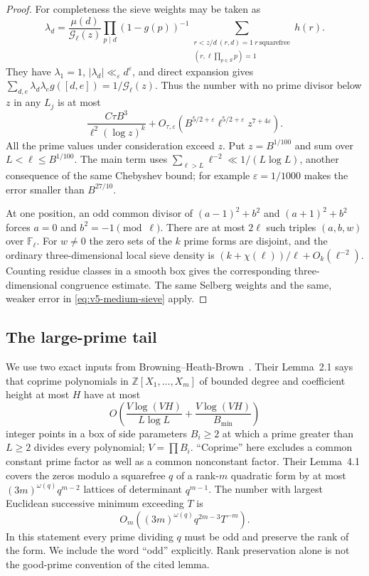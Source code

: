 \begin{proof}
For completeness the sieve weights may be taken as
\[
 \lambda_d=\frac{\mu(d)}{\mathcal G_\ell(z)}
 \prod_{p\mid d}(1-g(p))^{-1}
 \sum_{\substack{r<z/d\ (r,d)=1\ r\ \text{squarefree}\\
                      (r,\ell\prod_{p\in S}p)=1}}h(r).
\]
They have $\lambda_1=1$, $|\lambda_d|\ll_\varepsilon d^\varepsilon$,
and direct expansion gives
$\sum_{d,e}\lambda_d\lambda_e g([d,e])=1/\mathcal G_\ell(z)$.
Thus the number with no prime divisor below $z$ in any $L_j$ is at most
\[
 \frac{C\tau B^3}{\ell^2(\log z)^k}
 +O_{\tau,\varepsilon}
  (B^{5/2+\varepsilon}\ell^{5/2+\varepsilon}z^{7+4\varepsilon}).
\]
All the prime values under consideration exceed $z$. Put $z=B^{1/100}$
and sum over $L<\ell\leq B^{1/100}$. The main term uses
$\sum_{\ell>L}\ell^{-2}\ll1/(L\log L)$, another consequence of the
same Chebyshev bound; for example
$\varepsilon=1/1000$ makes the error smaller than $B^{27/10}$.

At one position, an odd common divisor of $(a-1)^2+b^2$ and
$(a+1)^2+b^2$ forces $a=0$ and $b^2=-1\pmod\ell$.
There are at most $2\ell$ such triples $(a,b,w)$ over $\mathbb F_\ell$.
For $w\ne0$ the zero sets of the $k$ prime forms are disjoint, and the
ordinary three-dimensional local sieve density is
$(k+\chi(\ell))/\ell+O_k(\ell^{-2})$.
Counting residue classes in a smooth box gives the corresponding
three-dimensional congruence estimate. The same Selberg weights and the
same, weaker error in \eqref{eq:v5-medium-sieve} apply.
\end{proof}

\subsection{The large-prime tail}\label{subsec:v5-large-sieve}

We use two exact inputs from Browning--Heath-Brown~\cite{v5bhb}.
Their Lemma~2.1 says that coprime polynomials in $\mathbb Z[X_1,\ldots,X_m]$
of bounded degree and coefficient height at most $H$ have at most
\begin{equation}\label{eq:v5-box-sieve}
 O\left(\frac{V\log(VH)}{L\log L}
           +\frac{V\log(VH)}{B_{\min}}\right)
\end{equation}
integer points in a box of side parameters $B_i\geq2$ at which a prime
greater than $L\geq2$ divides every polynomial; $V=\prod B_i$.
``Coprime'' here excludes a common constant prime factor as well as a
common nonconstant factor. Their Lemma~4.1 covers the zeros modulo a
squarefree $q$ of a rank-$m$ quadratic form by at most
$(3m)^{\omega(q)}q^{m-2}$ lattices of determinant $q^{m-1}$.
The number with largest Euclidean successive minimum exceeding $T$ is
\begin{equation}\label{eq:v5-lattice-tail}
 O_m((3m)^{\omega(q)}q^{2m-3}T^{-m}).
\end{equation}
In this statement every prime dividing $q$ must be odd and preserve the
rank of the form. We include the word ``odd'' explicitly. Rank preservation
alone is not the good-prime convention of the cited lemma.

